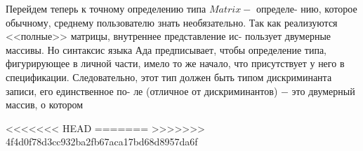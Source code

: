 Перейдем  теперь  к  точному  определению  типа $Matrix-$ определе-\linebreak
нию,  которое  обычному,  среднему  пользователю знать  необязательно.\linebreak 
Так  как  реализуются  <<полные>>  матрицы,  внутреннее  представление  ис-\linebreak
пользует  двумерные  массивы.  Но  синтаксис  языка  Ада  предписывает,\linebreak
чтобы  определение  типа,  фигурирующее  в  личной  части,  имело  то же\linebreak
начало,  что присутствует  у  него  в спецификации.  Следовательно, этот\linebreak
тип  должен  быть  типом  дискриминанта  записи,  его  единственное  по-\linebreak
ле  (отличное от  дискриминантов)  $-$ это двумерный  массив,  о котором\linebreak
\newpage

<<<<<<< HEAD
%
=======
>>>>>>> 4f4d0f78d3cc932ba2fb67aca17bd68d8957da6f
